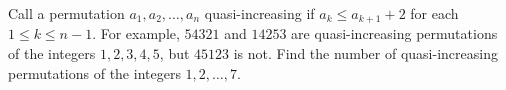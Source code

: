 Call a permutation $a_1,a_2,\ldots,a_n$ quasi-increasing if $a_k\le a_{k+1}+2$ for each $1\le k\le n-1$. For example, $54321$ and $14253$ are quasi-increasing permutations of the integers $1,2,3,4,5$,  but $45123$ is not. Find the number of quasi-increasing permutations of the integers $1,2,\ldots,7$.